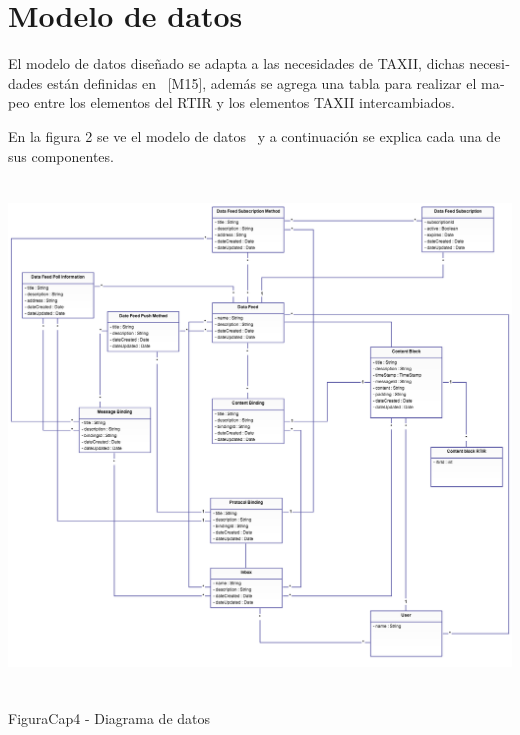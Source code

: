 	
	\bigskip
	
	\section[Modelo de datos]{\foreignlanguage{spanish}{Modelo de datos}}
	\foreignlanguage{spanish}{El modelo de datos diseñado se adapta a las necesidades de TAXII, dichas necesidades están
		definidas en \ [M15], además se agrega una tabla para realizar el mapeo entre los elementos del RTIR y los elementos
		TAXII intercambiados.}
	
	\foreignlanguage{spanish}{En la figura 2 se ve el modelo de datos \ y a continuación se explica cada una de sus
		componentes.}
	
	\includegraphics[width=5.7638in,height=5.3126in]{Diseno21-img/Diseno21-img004.png} 
	{\centering
		\foreignlanguage{spanish}{FiguraCap4 }\foreignlanguage{spanish}{ - Diagrama de datos}
		\par}
	
	\bigskip
	
	
	\bigskip
	
	
	\bigskip
	
